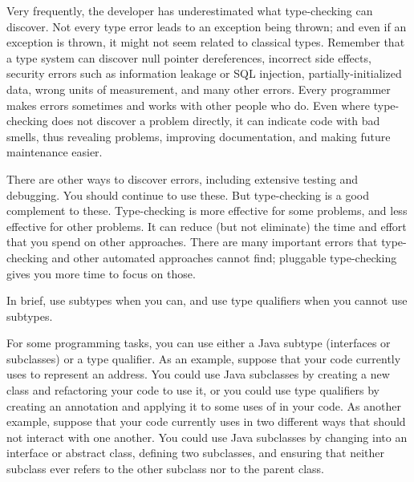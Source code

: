 Very frequently, the developer has underestimated what type-checking can
discover.  Not every type error leads to an exception being thrown; and
even if an exception is thrown, it might not seem related to classical types.
Remember that a type system can discover
null pointer dereferences,
incorrect side effects,
security errors such as information leakage or SQL injection,
partially-initialized data,
wrong units of measurement,
and many other errors.
Every programmer makes errors sometimes and works with other people
who do.
Even where type-checking does not discover a
problem directly, it can indicate code with bad smells, thus revealing
problems, improving documentation, and making future maintenance easier.

There are other ways to discover errors, including extensive testing and
debugging.  You should continue to use these.
But type-checking is a good complement to these.  Type-checking is more
effective for some problems, and less effective for other problems.  It can
reduce (but not eliminate) the time and effort that you spend on other
approaches.  There are many important errors that type-checking and other
automated approaches cannot find; pluggable type-checking gives you more
time to focus on those.



\label{when-to-use-type-qualifiers}
\label{faq-qualifiers-vs-subclasses}

In brief, use subtypes when you can, and use type qualifiers when you cannot
use subtypes.

For some programming tasks, you can use either a Java subtype (interfaces
or subclasses) or a type
qualifier.  As an example, suppose that your code currently uses  to
represent an address.  You could use Java subclasses by creating a new
 class and refactoring your code to use it, or you could use
type qualifiers by creating an  annotation and applying it
to some uses of  in your code.  As another example, suppose
that your code currently uses  in two different ways that
should not interact with one another.  You could use Java subclasses by
changing  into an interface or abstract class, defining two
subclasses, and ensuring that neither subclass ever refers to the other
subclass nor to the parent class.

